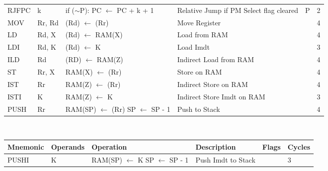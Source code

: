 \begin{footnotesize}
\begin{tabular}{|p{14.5mm}|p{14mm}|p{47mm}|p{46.5mm}|p{14mm}|p{10mm}|}
    RJFPC    & k         & if ($\sim$P): PC $\leftarrow$ PC + k + 1                               & Relative Jump \newline if PM Select flag cleared   & P              & 2      \\
    MOV      & Rr, Rd    & (Rd) $\leftarrow$ (Rr)                                                 & Move Register                             &                & 4      \\
    LD       & Rd, X     & (Rd) $\leftarrow$ RAM(X)                                               & Load from RAM                             &                & 4      \\
    LDI      & Rd, K     & (Rd) $\leftarrow$ K                                                    & Load Imdt                                 &                & 3      \\
    ILD      & Rd        & (RD) $\leftarrow$ RAM(Z)                                               & Indirect Load from RAM                    &                & 4      \\
    ST       & Rr, X     & RAM(X) $\leftarrow$ (Rr)                                               & Store on RAM                              &                & 4      \\
    IST      & Rr        & RAM(Z) $\leftarrow$ (Rr)                                               & Indirect Store on RAM                     &                & 4      \\
    ISTI     & K         & RAM(Z) $\leftarrow$ K                                                  & Indirect Store Imdt on RAM                &                & 3      \\
    PUSH     & Rr        & RAM(SP) $\leftarrow$ (Rr) \newline SP $\leftarrow$ SP - 1              & Push to Stack                             &                & 4      \\
    \hline
\end{tabular}
\newline\\
\begin{tabular}{|p{14.5mm}|p{14mm}|p{47mm}|p{46.5mm}|p{14mm}|p{10mm}|}
    \rowcolor{gray!50}
    \hline
    Mnemonic & Operands  & Operation                                                              & Description & Flags & Cycles \\ \hline
    PUSHI    & K         & RAM(SP) $\leftarrow$ K \newline SP $\leftarrow$ SP - 1                 & Push Imdt to Stack                        &                & 3      \\

\end{tabular}
\end{footnotesize}
